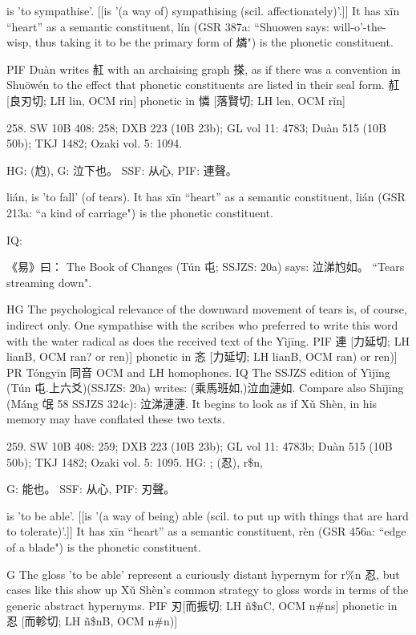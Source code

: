 is 'to sympathise'. [[is '(a way of) sympathising (scil. affectionately)'.]]
It has xīn ``heart'' as a semantic constituent,
lín (GSR 387a: ``Shuowen says: will-o'-the-wisp, thus taking it to be the primary form of 燐") is the phonetic constituent.



PIF     Duàn writes 䞑 with an archaising graph 搽, as if there was a convention in Shuōwén to the effect that phonetic constituents are listed in their seal form.
䞑[良刃切; LH lin, OCM rin] phonetic in 憐 [落賢切; LH len, OCM rǐn]

258. SW 10B 408: 258; DXB 223 (10B 23b); GL vol 11: 4783; Duàn 515 (10B 50b); TKJ 1482; Ozaki vol. 5: 1094.


HG:	(尥),
G:	泣下也。
SSF: 从心,
PIF: 連聲。

lián,
is 'to fall' (of tears).
It has xīn ``heart'' as a semantic constituent,
lián (GSR 213a: ``a kind of carriage") is the phonetic constituent.

IQ:

《易》曰： The Book of Changes (Tún 屯; SSJZS: 20a) says:
泣涕尥如。 ``Tears streaming down".

HG The psychological relevance of the downward movement of tears is, of course, indirect only. One sympathise with the scribes who preferred to write this word with the water radical as does the received text of the Yìjīng.
PIF 連 [力延切; LH lianB, OCM ran? or ren)] phonetic in 忞 [力延切; LH lianB, OCM ran) or ren)]
PR   Tóngyīn 同音 OCM and LH homophones.
IQ The SSJZS edition of Yìjīng (Tún 屯.上六爻)(SSJZS: 20a) writes: (乘馬班如,)泣血漣如. Compare also Shījīng (Máng 氓 58 SSJZS 324c): 泣涕漣漣. It begins to look as if Xǔ Shèn, in his memory may have conflated these two texts.


259. SW 10B 408: 259; DXB 223 (10B 23b); GL vol 11: 4783b; Duàn 515 (10B 50b); TKJ 1482; Ozaki vol. 5: 1095.
HG: ; (忍), r\$n,

G:	能也。
SSF: 从心,
PIF: 刃聲。

is 'to be able'. [[is '(a way of being) able (scil. to put up with things that are hard to tolerate)'.]]
It has xīn ``heart'' as a semantic constituent,
rèn (GSR 456a: ``edge of a blade") is the phonetic constituent.

G	The gloss 'to be able' represent a curiously distant hypernym for r\%n 忍, but cases like this show up Xǔ Shèn's common strategy to gloss words in terms of the generic abstract hypernyms.
PIF     刃[而振切; LH ñ\$nC, OCM n\#ns] phonetic in 忍 [而軫切; LH ñ\$nB, OCM n\#n)]



